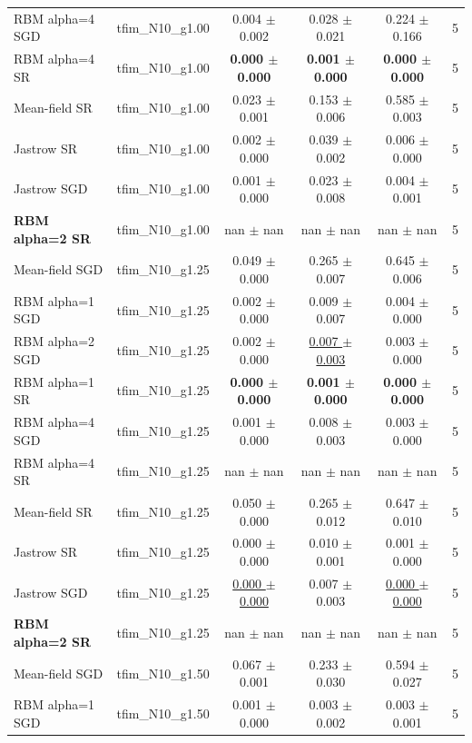 \begin{tabular}{llcccc}
RBM alpha=4 SGD & tfim\_N10\_g1.00 & 0.004 $\pm$ 0.002 & 0.028 $\pm$ 0.021 & 0.224 $\pm$ 0.166 & 5 \\
RBM alpha=4 SR & tfim\_N10\_g1.00 & \textbf{0.000 $\pm$ 0.000} & \textbf{0.001 $\pm$ 0.000} & \textbf{0.000 $\pm$ 0.000} & 5 \\
Mean-field SR & tfim\_N10\_g1.00 & 0.023 $\pm$ 0.001 & 0.153 $\pm$ 0.006 & 0.585 $\pm$ 0.003 & 5 \\
Jastrow SR & tfim\_N10\_g1.00 & 0.002 $\pm$ 0.000 & 0.039 $\pm$ 0.002 & 0.006 $\pm$ 0.000 & 5 \\
Jastrow SGD & tfim\_N10\_g1.00 & 0.001 $\pm$ 0.000 & 0.023 $\pm$ 0.008 & 0.004 $\pm$ 0.001 & 5 \\
\textbf{RBM alpha=2 SR} & tfim\_N10\_g1.00 & nan $\pm$ nan & nan $\pm$ nan & nan $\pm$ nan & 5 \\
\midrule
Mean-field SGD & tfim\_N10\_g1.25 & 0.049 $\pm$ 0.000 & 0.265 $\pm$ 0.007 & 0.645 $\pm$ 0.006 & 5 \\
RBM alpha=1 SGD & tfim\_N10\_g1.25 & 0.002 $\pm$ 0.000 & 0.009 $\pm$ 0.007 & 0.004 $\pm$ 0.000 & 5 \\
RBM alpha=2 SGD & tfim\_N10\_g1.25 & 0.002 $\pm$ 0.000 & \underline{0.007 $\pm$ 0.003} & 0.003 $\pm$ 0.000 & 5 \\
RBM alpha=1 SR & tfim\_N10\_g1.25 & \textbf{0.000 $\pm$ 0.000} & \textbf{0.001 $\pm$ 0.000} & \textbf{0.000 $\pm$ 0.000} & 5 \\
RBM alpha=4 SGD & tfim\_N10\_g1.25 & 0.001 $\pm$ 0.000 & 0.008 $\pm$ 0.003 & 0.003 $\pm$ 0.000 & 5 \\
RBM alpha=4 SR & tfim\_N10\_g1.25 & nan $\pm$ nan & nan $\pm$ nan & nan $\pm$ nan & 5 \\
Mean-field SR & tfim\_N10\_g1.25 & 0.050 $\pm$ 0.000 & 0.265 $\pm$ 0.012 & 0.647 $\pm$ 0.010 & 5 \\
Jastrow SR & tfim\_N10\_g1.25 & 0.000 $\pm$ 0.000 & 0.010 $\pm$ 0.001 & 0.001 $\pm$ 0.000 & 5 \\
Jastrow SGD & tfim\_N10\_g1.25 & \underline{0.000 $\pm$ 0.000} & 0.007 $\pm$ 0.003 & \underline{0.000 $\pm$ 0.000} & 5 \\
\textbf{RBM alpha=2 SR} & tfim\_N10\_g1.25 & nan $\pm$ nan & nan $\pm$ nan & nan $\pm$ nan & 5 \\
\midrule
Mean-field SGD & tfim\_N10\_g1.50 & 0.067 $\pm$ 0.001 & 0.233 $\pm$ 0.030 & 0.594 $\pm$ 0.027 & 5 \\
RBM alpha=1 SGD & tfim\_N10\_g1.50 & 0.001 $\pm$ 0.000 & 0.003 $\pm$ 0.002 & 0.003 $\pm$ 0.001 & 5 \\

\end{tabular}
